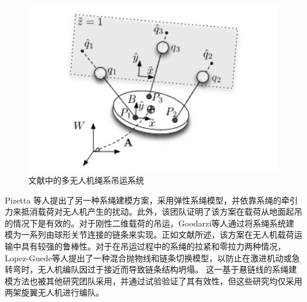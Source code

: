 \documentclass[lang=chs, degree=master, blindreview=false, winfonts=true]{yanputhesis}
\begin{document}
\begin{figure}[hbt!]
	\centering
	\includegraphics[width=28pc]{picture/1_5.png} 
	\caption{文献中的多无人机绳系吊运系统} \label{1_5}
\end{figure}
Pizetta 等人\cite{pizetta2019avoiding}提出了另一种系绳建模方案，采用弹性系绳模型，并依靠系绳的牵引力来抵消载荷对无人机产生的扰动。此外，该团队证明了该方案在载荷从地面起吊的情况下是有效的。对于刚性二维载荷的吊运，Goodarzi等人\cite{goodarzi2016stabilization}通过将系绳系统建模为一系列由球形关节连接的链条来实现。正如文献所述，该方案在无人机载荷运输中具有较强的鲁棒性。对于在吊运过程中的系绳的拉紧和零拉力两种情况，Lopez-Guede等人\cite{estevez2022hybrid}提出了一种混合抛物线和链条切换模型，以防止在激进机动或急转弯时，无人机编队因过于接近而导致链条结构坍塌。
这一基于悬链线的系绳建模方法也被其他研究团队\cite{d2021catenary,abhishek2021towards}采用，并通过试验验证了其有效性，但这些研究均仅采用两架旋翼无人机进行编队。
\end{document}

